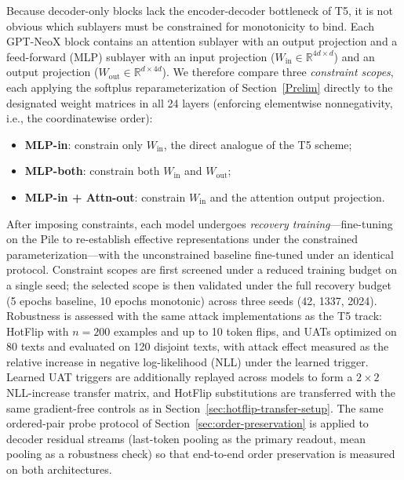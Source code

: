 \documentclass{article}
\theoremstyle{plain}
\theoremstyle{definition}
\theoremstyle{remark}
\begin{document}
Because decoder-only blocks lack the encoder-decoder bottleneck of T5, it is not obvious which sublayers must be constrained for monotonicity to bind. Each GPT-NeoX block contains an attention sublayer with an output projection and a feed-forward (MLP) sublayer with an input projection ($W_{\mathrm{in}} \in \mathbb{R}^{4d \times d}$) and an output projection ($W_{\mathrm{out}} \in \mathbb{R}^{d \times 4d}$). We therefore compare three \emph{constraint scopes}, each applying the softplus reparameterization of Section~\ref{Prelim} directly to the designated weight matrices in all 24 layers (enforcing elementwise nonnegativity, i.e., the coordinatewise order):
\begin{itemize}
    \item \textbf{MLP-in}: constrain only $W_{\mathrm{in}}$, the direct analogue of the T5 scheme;
    \item \textbf{MLP-both}: constrain both $W_{\mathrm{in}}$ and $W_{\mathrm{out}}$;
    \item \textbf{MLP-in + Attn-out}: constrain $W_{\mathrm{in}}$ and the attention output projection.
\end{itemize}
After imposing constraints, each model undergoes \emph{recovery training}—fine-tuning on the Pile to re-establish effective representations under the constrained parameterization—with the unconstrained baseline fine-tuned under an identical protocol. Constraint scopes are first screened under a reduced training budget on a single seed; the selected scope is then validated under the full recovery budget (5 epochs baseline, 10 epochs monotonic) across three seeds (42, 1337, 2024). Robustness is assessed with the same attack implementations as the T5 track: HotFlip with $n = 200$ examples and up to 10 token flips, and UATs optimized on 80 texts and evaluated on 120 disjoint texts, with attack effect measured as the relative increase in negative log-likelihood (NLL) under the learned trigger. Learned UAT triggers are additionally replayed across models to form a $2\times 2$ NLL-increase transfer matrix, and HotFlip substitutions are transferred with the same gradient-free controls as in Section~\ref{sec:hotflip-transfer-setup}. The same ordered-pair probe protocol of Section~\ref{sec:order-preservation} is applied to decoder residual streams (last-token pooling as the primary readout, mean pooling as a robustness check) so that end-to-end order preservation is measured on both architectures.
\end{document}

